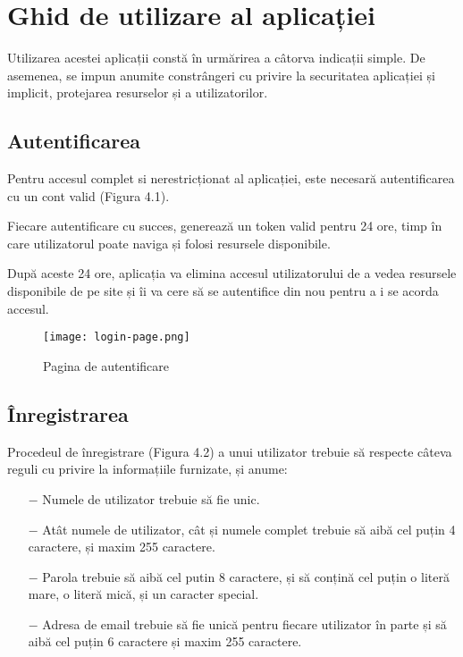 \chapter{Ghid de utilizare al aplicației}

Utilizarea acestei aplicații constă în urmărirea a câtorva indicații simple. De asemenea, se impun anumite constrângeri cu privire la securitatea aplicației și implicit, protejarea resurselor și a utilizatorilor.\newline

\section{Autentificarea}

Pentru accesul complet si nerestricționat al aplicației, este necesară autentificarea cu un cont valid (Figura 4.1).\newline

Fiecare autentificare cu succes, generează un token valid pentru 24 ore, timp în care utilizatorul poate naviga și folosi resursele disponibile.\newline

După aceste 24 ore, aplicația va elimina accesul utilizatorului de a vedea resursele disponibile de pe site și îi va cere să se autentifice din nou pentru a i se acorda accesul.\newline

\begin{figure}[H]
	\begin{center}
		\texttt{[image: login-page.png]}
		\caption{Pagina de autentificare}
	\end{center}
\end{figure}
\bigskip

\section{Înregistrarea}

Procedeul de înregistrare (Figura 4.2) a unui utilizator trebuie să respecte câteva reguli cu privire la informațiile furnizate, și anume:
\begin{itemize}
	\addtolength{\itemindent}{1cm}
	\item[$-$]Numele de utilizator trebuie să fie unic.
	\item[$-$]Atât numele de utilizator, cât și numele complet trebuie să aibă cel puțin 4 caractere, și maxim 255 caractere.
	\item[$-$]Parola trebuie să aibă cel putin 8 caractere, și să conțină cel puțin o literă mare, o literă mică, și un caracter special.
	\item[$-$]Adresa de email trebuie să fie unică pentru fiecare utilizator în parte și să aibă cel puțin 6 caractere și maxim 255 caractere.
	\newline
\end{itemize}

